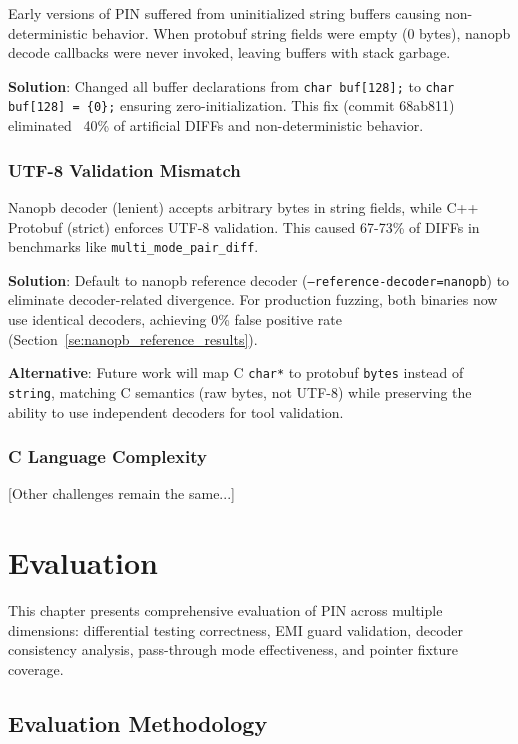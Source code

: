 \documentclass[doublespace,nopageskip]{VTthesis}
\begin{document}
  Early versions of PIN suffered from uninitialized string buffers causing non-deterministic behavior. When protobuf string fields were empty (0 bytes), nanopb decode callbacks were never invoked, leaving buffers with stack garbage.

  \textbf{Solution}: Changed all buffer declarations from \texttt{char buf[128];} to \texttt{char buf[128] = \{0\};} ensuring zero-initialization. This fix (commit 68ab811) eliminated ~40\% of artificial DIFFs and non-deterministic behavior.

  \subsection{UTF-8 Validation Mismatch}

  Nanopb decoder (lenient) accepts arbitrary bytes in string fields, while C++ Protobuf (strict) enforces UTF-8 validation. This caused 67-73\% of DIFFs in benchmarks like \texttt{multi\_mode\_pair\_diff}.

  \textbf{Solution}: Default to nanopb reference decoder (\texttt{--reference-decoder=nanopb}) to eliminate decoder-related divergence. For production fuzzing, both binaries now use identical decoders, achieving 0\% false positive rate (Section~\ref{se:nanopb_reference_results}).

  \textbf{Alternative}: Future work will map C \texttt{char*} to protobuf \texttt{bytes} instead of \texttt{string}, matching C semantics (raw bytes, not UTF-8) while preserving the ability to use independent decoders for tool validation.

  \subsection{C Language Complexity}

  [Other challenges remain the same...]

\chapter{Evaluation} \label{ch:evaluation}

This chapter presents comprehensive evaluation of PIN across multiple dimensions: differential testing correctness, EMI guard validation, decoder consistency analysis, pass-through mode effectiveness, and pointer fixture coverage.

\section{Evaluation Methodology} \label{se:eval_methodology}
\end{document}
